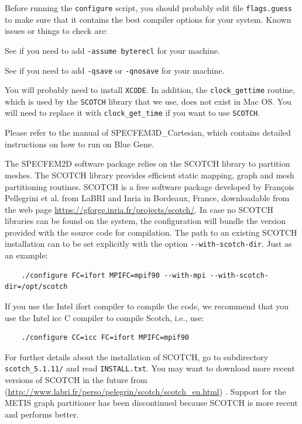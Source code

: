\documentclass[oneside,english,onecolumn,letterpaper]{book}
\newcommand{\urlwithparentheses}[1]{(\url{#1})}
\begin{document}
Before running the \texttt{configure} script, you should probably edit file \texttt{flags.guess} to make sure that it contains the best compiler options for your system. Known issues or things to check are:

\begin{description}[font=\ttfamily]
\item [Intel ifort compiler] See if you need to add \texttt{-assume byterecl} for your machine.
\item [IBM compiler] See if you need to add \texttt{-qsave} or \texttt{-qnosave} for your machine.
\item [Mac OS] You will probably need to install \texttt{XCODE}.
In addition, the \texttt{clock\_gettime} routine, which is used by the \texttt{SCOTCH} library that we use, does not exist in Mac OS.
You will need to replace it with \texttt{clock\_get\_time} if you want to use \texttt{SCOTCH}.
\item [IBM Blue Gene machines] Please refer to the manual of SPECFEM3D\_Cartesian, which contains detailed instructions on how to run on Blue Gene.
\end{description}

The SPECFEM2D software package relies on the SCOTCH library to partition meshes.
The SCOTCH library \citep{PeRo96}
provides efficient static mapping, graph and mesh partitioning routines. SCOTCH is a free software package developed by
Fran\c{c}ois Pellegrini et al. from LaBRI and Inria in Bordeaux, France, downloadable from the web page \url{https://gforge.inria.fr/projects/scotch/}.
In case no SCOTCH libraries can be found on the system, the configuration will bundle the version provided with the source code for compilation.
The path to an existing SCOTCH installation can to be set explicitly with the option \texttt{-{}-with-scotch-dir}.
Just as an example:
%
\begin{verbatim}
    ./configure FC=ifort MPIFC=mpif90 --with-mpi --with-scotch-dir=/opt/scotch
\end{verbatim}
%
If you use the Intel ifort compiler to compile the code, we recommend that you use the Intel icc C compiler to compile Scotch, i.e., use:
%
\begin{verbatim}
    ./configure CC=icc FC=ifort MPIFC=mpif90
\end{verbatim}
%
For further details about the installation of SCOTCH,
go to subdirectory \texttt{scotch\_5.1.11/} and read \texttt{INSTALL.txt}. You may want to download more recent versions of SCOTCH in the future from \urlwithparentheses{http://www.labri.fr/perso/pelegrin/scotch/scotch_en.html} . Support for the METIS graph partitioner has been discontinued because SCOTCH is more recent and performs better.
\end{document}
